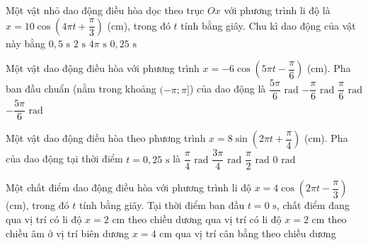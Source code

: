 \begin{ex}
Một vật nhỏ dao động điều hòa dọc theo trục $Ox$ với phương trình li độ là $x = 10\cos(4\pi t + \dfrac{\pi}{3})$ (cm), trong đó $t$ tính bằng giây. Chu kì dao động của vật này bằng
\choice
{\True $0,5\text{ s}$}
{$2\text{ s}$}
{$4\pi\text{ s}$}
{$0,25\text{ s}$}
\end{ex}

\begin{ex}
Một vật dao động điều hòa với phương trình $x = -6\cos(5\pi t - \dfrac{\pi}{6})$ (cm). Pha ban đầu chuẩn (nằm trong khoảng $(-\pi; \pi]$) của dao động là
\choice
{\True $\dfrac{5\pi}{6}\text{ rad}$}
{$-\dfrac{\pi}{6}\text{ rad}$}
{$\dfrac{\pi}{6}\text{ rad}$}
{$-\dfrac{5\pi}{6}\text{ rad}$}
\end{ex}

\begin{ex}
Một vật dao động điều hòa theo phương trình $x = 8\sin(2\pi t + \dfrac{\pi}{4})$ (cm). Pha của dao động tại thời điểm $t = 0,25\text{ s}$ là
\choice
{\True $\dfrac{\pi}{4}\text{ rad}$}
{$\dfrac{3\pi}{4}\text{ rad}$}
{$\dfrac{\pi}{2}\text{ rad}$}
{$0\text{ rad}$}
\end{ex}

\begin{ex}
Một chất điểm dao động điều hòa với phương trình li độ $x = 4\cos(2\pi t - \dfrac{\pi}{3})$ (cm), trong đó $t$ tính bằng giây. Tại thời điểm ban đầu $t = 0\text{ s}$, chất điểm đang
\choice
{\True qua vị trí có li độ $x = 2\text{ cm}$ theo chiều dương}
{qua vị trí có li độ $x = 2\text{ cm}$ theo chiều âm}
{ở vị trí biên dương $x = 4\text{ cm}$}
{qua vị trí cân bằng theo chiều dương}
\end{ex}

